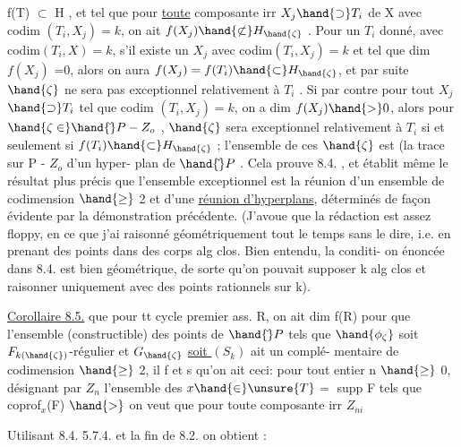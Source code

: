  f(T) $\subset$ H , et tel que pour \uline{toute} composante irr $X_j \hand{\supset} T_i$ de X
avec codim $(T_i,X_j)=k$, on ait $f(X_j)\hand{\not\subset} H_{\hand{\zeta}}$ . Pour un $T_i$ donné,
 avec codim$(T_i,X)=k$, s'il existe un $X_j$ avec codim$(T_i,X_j)=k$
et tel que dim $f(X_j)$ =0, alors 
 on aura $f(X_j) = f(T_i) \hand{\subset} H_{\hand{\zeta}}$, et par suite $\hand{\zeta}$ ne
sera pas exceptionnel relativement à $T_i$ . Si par contre pour tout $X_j$
$\hand{\supset} T_i$ tel que codim $(T_i,X_j) = k$, on a dim $f(X_j) \hand{>} 0$, alors pour
$\hand{\zeta \in} \hand{\check{}}P - Z_o$ , $\hand{\zeta}$ sera exceptionnel relativement à $T_i$ si et seulement si
$f(T_i) \hand{\subset} H_{\hand{\zeta}}$ ; l'ensemble de ces $\hand{\zeta}$ est (la trace sur P - $Z_o$\unsure{$\neq$} d'\hand{)}un hyper-
plan de $\hand{\check{}}P$ . Cela prouve 8.4. , et établit même le résultat plus précis
que l'ensemble exceptionnel est la réunion d'un ensemble de codimension
$\hand{\geq}$ 2 et d'une \uline{réunion d'hyperplans}, déterminés de façon évidente par la
démonstration précédente. (J'avoue que la rédaction est assez floppy, \placedmargin{\hand{|}}
en ce que j'ai raisonné géométriquement tout le temps sans le dire, i.e.
en prenant des points dans des corps alg clos. Bien entendu, la conditi-
on énoncée dans 8.4. est bien géométrique, de sorte qu'on pouvait supposer
k alg clos et raisonner uniquement avec des points rationnels sur k).






 \hand{$\delta$} \uline{Corollaire 8.5.}  que pour tt cycle premier ass. R, on ait dim f(R)
 pour que l'ensemble (constructible) des points \unsure{$\zeta$}
de $\hand{\check{}}P$ tels que $\hand{\phi_\zeta}$ soit $F_{k(\hand{\zeta})}$-régulier et $G_{\hand{\zeta}}$ \uline{soit $(S_k)$}  ait un complé-
mentaire de codimension $\hand{\geq}$ 2, il f et s qu'on ait ceci: pour tout 
entier n $\hand{\geq}$ 0, désignant par $Z_n$ l'ensemble des $x \hand{\in} \unsure{T}$$=$ supp F tels que coprof$_x$(F) $\hand{>}$
 on veut que pour toute composante irr $Z_{ni}$

\hand{$\delta$} Utilisant 8.4. 5.7.4. et la fin de 8.2. on obtient :
